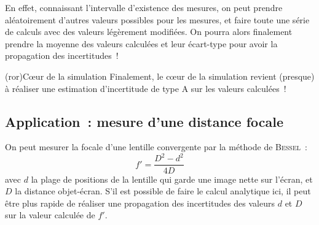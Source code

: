 \documentclass[a4paper, 12pt, garamond]{book}
\begin{document}
En effet, connaissant l'intervalle d'existence des mesures, on peut prendre
aléatoirement d'autres valeurs possibles pour les mesures, et faire toute une
série de calculs avec des valeurs légèrement modifiées. On pourra alors
finalement prendre la moyenne des valeurs calculées et leur écart-type pour
avoir la propagation des incertitudes~!

\begin{tcb}(ror){Cœur de la simulation}
	Finalement, le cœur de la simulation revient (presque) à réaliser une estimation
	d'incertitude de type A sur les valeurs calculées~!
\end{tcb}

\subsection{Application~: mesure d'une distance focale}
On peut mesurer la focale d'une lentille convergente par la méthode de
\textsc{Bessel}~:
\[
	\boxed{f' = \frac{D^{2}-d^{2}}{4D}}
\]
avec $d$ la plage de positions de la lentille qui garde une image nette sur
l'écran, et $D$ la distance objet-écran. S'il est possible de faire le calcul
analytique ici, il peut être plus rapide de réaliser une propagation des
incertitudes des valeurs $d$ et $D$ sur la valeur calculée de $f'$.
\end{document}
